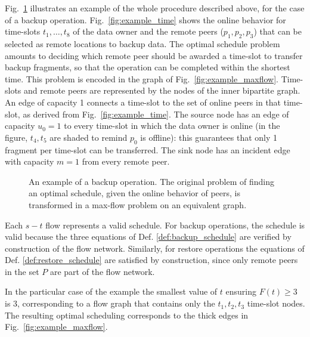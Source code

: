 \documentclass[conference,10pt]{IEEEtran}
\begin{document}
Fig.~\ref{fig:maxflow} illustrates an example of the whole procedure
described above, for the case of a backup
operation. Fig.~\ref{fig:example_time} shows the online behavior for
time-slots $t_1, \ldots, t_8$ of the data owner and the remote peers
($p_1, p_2, p_3$) that can be selected as remote locations to backup
data. The optimal schedule problem amounts to deciding which remote
peer should be awarded a time-slot to transfer backup fragments, so
that the operation can be completed within the shortest time. This
problem is encoded in the graph of
Fig.~\ref{fig:example_maxflow}. Time-slots and remote peers are
represented by the nodes of the inner bipartite graph. An edge of
capacity 1 connects a time-slot to the set of online peers in that
time-slot, as derived from Fig.~\ref{fig:example_time}. The source
node has an edge of capacity $u_0=1$ to every time-slot in which the
data owner is online (in the figure, $t_4,t_5$ are shaded to remind
$p_0$ is offline): this guarantees that only 1 fragment per time-slot
can be transferred. The sink node has an incident edge with capacity
$m=1$ from every remote peer.

\begin{figure}
\centering
	
	
	\caption{An example of a backup operation. The original problem of finding an optimal schedule, given the online behavior of peers, is transformed in a max-flow problem on an equivalent graph.} \label{fig:maxflow} 
\end{figure}

Each $s-t$ flow represents a valid schedule. For backup operations,
the schedule is valid because the three equations of
Def. \ref{def:backup_schedule} are verified by construction of the
flow network. Similarly, for restore operations the equations of
Def. \ref{def:restore_schedule} are satisfied by construction, since
only remote peers in the set $P$ are part of the flow network.

In the particular case of the example the smallest value of $t$
ensuring $F(t)\geq 3$ is 3, corresponding to a flow graph that
contains only the $t_1, t_2, t_3$ time-slot nodes. The resulting
optimal scheduling corresponds to the thick edges in
Fig.~\ref{fig:example_maxflow}.
\end{document}
